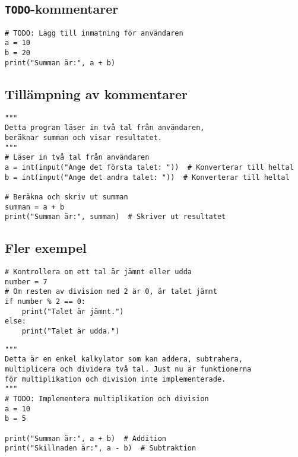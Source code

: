 \subsection*{\texttt{TODO}-kommentarer}

\begin{lstlisting}[title=Exempel 7: Använd TODO-kommentarer för framtida uppgifter]
# TODO: Lägg till inmatning för användaren
a = 10
b = 20
print("Summan är:", a + b)
\end{lstlisting}

\subsection*{Tillämpning av kommentarer}

\begin{lstlisting}[title=Exempel 8: Kombinera olika typer av kommentarer]
"""
Detta program läser in två tal från användaren,
beräknar summan och visar resultatet.
"""
# Läser in två tal från användaren
a = int(input("Ange det första talet: "))  # Konverterar till heltal
b = int(input("Ange det andra talet: "))  # Konverterar till heltal

# Beräkna och skriv ut summan
summan = a + b
print("Summan är:", summan)  # Skriver ut resultatet
\end{lstlisting}

\subsection*{Fler exempel}

\begin{lstlisting}[title=Exempel 9: Kommentarer för komplexa delar av koden]
# Kontrollera om ett tal är jämnt eller udda
number = 7
# Om resten av division med 2 är 0, är talet jämnt
if number % 2 == 0:
    print("Talet är jämnt.")
else:
    print("Talet är udda.")
\end{lstlisting}

\begin{lstlisting}[title=Exempel 10: Sätt din kod i kontext med kommentarer]
"""
Detta är en enkel kalkylator som kan addera, subtrahera,
multiplicera och dividera två tal. Just nu är funktionerna
för multiplikation och division inte implementerade.
"""
# TODO: Implementera multiplikation och division
a = 10
b = 5

print("Summan är:", a + b)  # Addition
print("Skillnaden är:", a - b)  # Subtraktion
\end{lstlisting}
